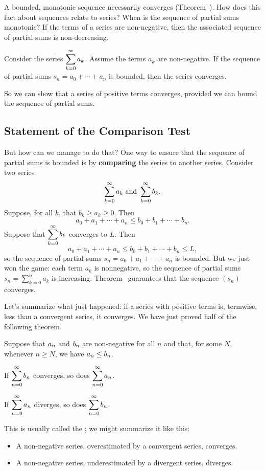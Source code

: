 
\nobreak A bounded, monotonic sequence necessarily converges
(Theorem~).  How does this fact about
sequences relate to series?  When is the sequence of partial sums
monotonic?  If the terms of a series are non-negative, then the
associated sequence of partial sums is non-decreasing.
\begin{corollary}
  Consider the series $\displaystyle\sum_{k=0}^\infty a_k$.  Assume the terms
  $a_k$ are non-negative.  If the sequence of partial sums $s_n = a_0
  + \cdots + a_n$ is bounded, then the series converges.
\end{corollary}
So we can show that a series of positive terms converges, provided we
can bound the sequence of partial sums.  

\subsection{Statement of the Comparison Test}

But how can we manage to do that?  One way to ensure that the sequence
of partial sums is bounded is by \textbf{comparing} the series to
another series.  Consider two series
$$
\displaystyle\sum_{k=0}^\infty a_k \mbox{ and }
\displaystyle\sum_{k=0}^\infty b_k.
$$
Suppose, for all $k$, that $b_k \geq a_k \geq 0$.  Then
$$
a_0 + a_1 + \cdots + a_n \leq b_0 + b_1 + \cdots + b_n.
$$
Suppose that $\displaystyle\sum_{k=0}^\infty b_k$ converges to $L$.  Then
$$
a_0 + a_1 + \cdots + a_n \leq b_0 + b_1 + \cdots + b_n \leq L,
$$
so the sequence of partial sums $s_n = a_0 + a_1 + \cdots + a_n$ is
bounded.  But we just won the game: each term $a_k$ is nonnegative, so
the sequence of partial sums $s_n = \sum_{k=0}^n a_k$ is increasing.
Theorem~ guarantees that the sequence
$(s_n)$ converges.

Let's summarize what just happened: if a series with positive terms
is, termwise, less than a convergent series, it converges.  We have
just proved half of the following theorem.
\begin{theorem}\label{thm:comparison-test}
Suppose that $\displaystyle a_n$ and $\displaystyle b_n$ are non-negative for all $n$ and
that, for some $N$, whenever $n \geq N$, we have $\displaystyle a_n \leq b_n$.

If $\displaystyle\sum_{n=0}^\infty b_n$ converges, so does $\displaystyle\sum_{n=0}^\infty a_n$.

If $\displaystyle\sum_{n=0}^\infty a_n$ diverges, so does $\displaystyle\sum_{n=0}^\infty b_n$.
\end{theorem}
This is usually called the ; we might summarize it like this:
\begin{itemize}
\item A non-negative series, overestimated by a convergent series, converges.
\item A non-negative series, underestimated by a divergent series, diverges.
\end{itemize}

